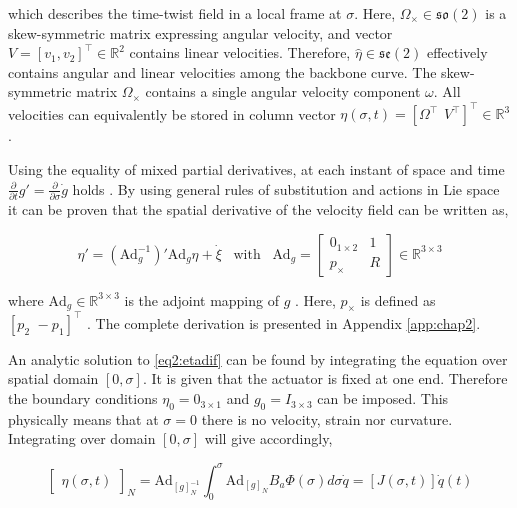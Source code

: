 which describes the time-twist field in a local frame at $\sigma$. Here, $\Omega_\times \in \mathfrak{so}(2)$ is a skew-symmetric matrix expressing angular velocity, and vector $V = [v_1,v_2]^\top \in \mathbb{R}^2$ contains linear velocities. Therefore, $\hat{\eta} \in \mathfrak{se}(2)$ effectively contains angular and linear velocities among the backbone curve. The skew-symmetric matrix $\Omega_\times$ contains a single angular velocity component $\omega$. All velocities can equivalently be stored in column vector $\eta(\sigma,t) = [\Omega^\top \hspace{5pt} V^\top]^\top \in \mathbb{R}^3$ \cite{Sola2018}.

Using the equality of mixed partial derivatives, at each instant of space and time $\frac{\partial}{\partial t}g' = \frac{\partial}{\partial \sigma}\dot{g}$ holds \cite{Caasenbrood2020}. By using general rules of substitution and actions in Lie space it can be proven that the spatial derivative of the velocity field can be written as,

\begin{equation}
    \eta'= (\text{Ad}_g^{-1})'\text{Ad}_g \eta + \Dot{\xi} \hspace{10pt} \text{with} \hspace{10pt} \text{Ad}_g = \begin{bmatrix} 0_{1 \times 2} & 1 \\ p_\times & R  \end{bmatrix} \in \mathbb{R}^{3\times 3}
    \label{eq2:etadif}
\end{equation}


where $\text{Ad}_g \in \mathbb{R}^{3 \times 3}$ \cite{2DLie} is the adjoint mapping of $g$ \cite{Sola2018}. Here, $p_\times$ is defined as $[p_2 \hspace{4pt} -p_1]^\top$ \cite{2DLie}. The complete derivation is presented in Appendix \ref{app:chap2}. 

An analytic solution to \ref{eq2:etadif} can be found by integrating the equation over spatial domain $[0,\sigma]$. It is given that the actuator is fixed at one end. Therefore the boundary conditions $\eta_0 = 0_{3 \times 1}$ and $g_0 = I_{3\times 3}$ can be imposed. This physically means that at $\sigma = 0$ there is no velocity, strain nor curvature. Integrating over domain $[0,\sigma]$ will give accordingly,

\begin{equation}
  \begin{bmatrix} \eta(\sigma,t)\end{bmatrix}_N = \text{Ad}_{[g]_N^{-1}} \int_0^{\sigma} \text{Ad}_{[g]_N} B_a \Phi(\sigma) d \sigma \dot{q} = [J(\sigma,t)]\dot{q}(t)
    \label{eq2:J}
\end{equation}


